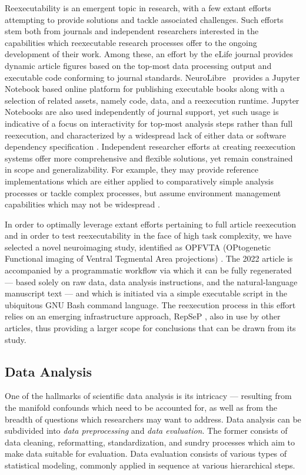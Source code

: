 Reexecutability is an emergent topic in research, with a few extant efforts attempting to provide solutions and tackle associated challenges.
Such efforts stem both from journals and independent researchers interested in the capabilities which reexecutable research processes offer to the ongoing development of their work.
Among these, an effort by the eLife journal \cite{eliferep} provides dynamic article figures based on the top-most data processing output and executable code conforming to journal standards.
NeuroLibre~\cite{neurolibre} provides a Jupyter Notebook based online platform for publishing executable books along with a selection of related assets, namely code, data, and a reexecution runtime.
Jupyter Notebooks are also used independently of journal support, yet such usage is indicative of a focus on interactivity for top-most analysis steps rather than full reexecution, and characterized by a widespread lack of either data or software dependency specification \cite{samuel2024}.
Independent researcher efforts at creating reexecution systems offer more comprehensive and flexible solutions, yet remain constrained in scope and generalizability.
For example, they may provide reference implementations which are either applied to comparatively simple analysis processes \cite{Dar2019} or tackle complex processes, but assume environment management capabilities which may not be widespread \cite{repsep}.

In order to optimally leverage extant efforts pertaining to full article reexecution and in order to test reexecutability in the face of high task complexity, we have selected a novel neuroimaging study, identified as OPFVTA (OPtogenetic Functional imaging of Ventral Tegmental Area projections) \cite{opfvta}.
The 2022 article is accompanied by a programmatic workflow via which it can be fully regenerated — based solely on raw data, data analysis instructions, and the natural-language manuscript text — and which is initiated via a simple executable script in the ubiquitous GNU Bash \cite{bash} command language.
The reexecution process in this effort relies on an emerging infrastructure approach, RepSeP \cite{repsep}, also in use by other articles, thus providing a larger scope for conclusions that can be drawn from its study.


\subsection{Data Analysis}

One of the hallmarks of scientific data analysis is its intricacy — resulting from the manifold confounds which need to be accounted for, as well as from the breadth of questions which researchers may want to address.
Data analysis can be subdivided into \emph{data preprocessing} and \emph{data evaluation}.
The former consists of data cleaning, reformatting, standardization, and sundry processes which aim to make data suitable for evaluation.
Data evaluation consists of various types of statistical modeling, commonly applied in sequence at various hierarchical steps.

